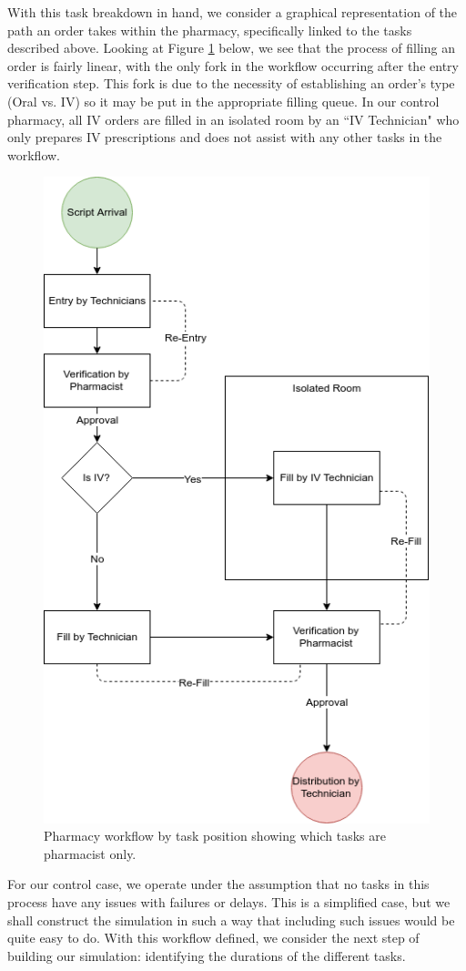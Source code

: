\documentclass[10pt]{report}            %
\begin{document}
With this task breakdown in hand, we consider a graphical representation of the path an order takes within the pharmacy, specifically linked to the tasks described above. Looking at Figure \ref{fig:flowchart} below, we see that the process of filling an order is fairly linear, with the only fork in the workflow occurring after the entry verification step. This fork is due to the necessity of establishing an order's type (Oral vs. IV) so it may be put in the appropriate filling queue. In our control pharmacy, all IV orders are filled in an isolated room by an ``IV Technician" who only prepares IV prescriptions and does not assist with any other tasks in the workflow. 
\begin{figure}[H]
\centering
\includegraphics[scale=.5]{Flowchart.png}
\caption{Pharmacy workflow by task position showing which tasks are pharmacist only.}
\label{fig:flowchart}
\end{figure}
For our control case, we operate under the assumption that no tasks in this process have any issues with failures or delays. This is a simplified case, but we shall construct the simulation in such a way that including such issues would be quite easy to do.  With this workflow defined, we consider the next step of building our simulation: identifying the durations of the different tasks.
\end{document}
